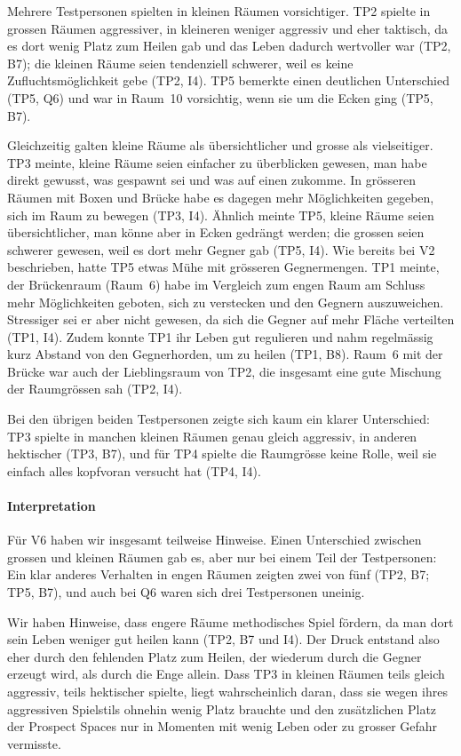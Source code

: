 \documentclass[../Main.tex]{subfiles}
\begin{document}
Mehrere Testpersonen spielten in kleinen Räumen vorsichtiger. TP2 spielte in grossen Räumen aggressiver, in kleineren weniger aggressiv und eher taktisch, da es dort wenig Platz zum Heilen gab und das Leben dadurch wertvoller war (TP2, B7); die kleinen Räume seien tendenziell schwerer, weil es keine Zufluchtsmöglichkeit gebe (TP2, I4). TP5 bemerkte einen deutlichen Unterschied (TP5, Q6) und war in Raum~10 vorsichtig, wenn sie um die Ecken ging (TP5, B7).

Gleichzeitig galten kleine Räume als übersichtlicher und grosse als vielseitiger. TP3 meinte, kleine Räume seien einfacher zu überblicken gewesen, man habe direkt gewusst, was gespawnt sei und was auf einen zukomme. In grösseren Räumen mit Boxen und Brücke habe es dagegen mehr Möglichkeiten gegeben, sich im Raum zu bewegen (TP3, I4). Ähnlich meinte TP5, kleine Räume seien übersichtlicher, man könne aber in Ecken gedrängt werden; die grossen seien schwerer gewesen, weil es dort mehr Gegner gab (TP5, I4). Wie bereits bei V2 beschrieben, hatte TP5 etwas Mühe mit grösseren Gegnermengen. TP1 meinte, der Brückenraum (Raum~6) habe im Vergleich zum engen Raum am Schluss mehr Möglichkeiten geboten, sich zu verstecken und den Gegnern auszuweichen. Stressiger sei er aber nicht gewesen, da sich die Gegner auf mehr Fläche verteilten (TP1, I4). Zudem konnte TP1 ihr Leben gut regulieren und nahm regelmässig kurz Abstand von den Gegnerhorden, um zu heilen (TP1, B8). Raum~6 mit der Brücke war auch der Lieblingsraum von TP2, die insgesamt eine gute Mischung der Raumgrössen sah (TP2, I4).

Bei den übrigen beiden Testpersonen zeigte sich kaum ein klarer Unterschied: TP3 spielte in manchen kleinen Räumen genau gleich aggressiv, in anderen hektischer (TP3, B7), und für TP4 spielte die Raumgrösse keine Rolle, weil sie einfach alles kopfvoran versucht hat (TP4, I4).

\paragraph{Interpretation}
Für V6 haben wir insgesamt teilweise Hinweise. Einen Unterschied zwischen grossen und kleinen Räumen gab es, aber nur bei einem Teil der Testpersonen: Ein klar anderes Verhalten in engen Räumen zeigten zwei von fünf (TP2, B7; TP5, B7), und auch bei Q6 waren sich drei Testpersonen uneinig.

Wir haben Hinweise, dass engere Räume methodisches Spiel fördern, da man dort sein Leben weniger gut heilen kann (TP2, B7 und I4). Der Druck entstand also eher durch den fehlenden Platz zum Heilen, der wiederum durch die Gegner erzeugt wird, als durch die Enge allein. Dass TP3 in kleinen Räumen teils gleich aggressiv, teils hektischer spielte, liegt wahrscheinlich daran, dass sie wegen ihres aggressiven Spielstils ohnehin wenig Platz brauchte und den zusätzlichen Platz der Prospect Spaces nur in Momenten mit wenig Leben oder zu grosser Gefahr vermisste.
\end{document}
